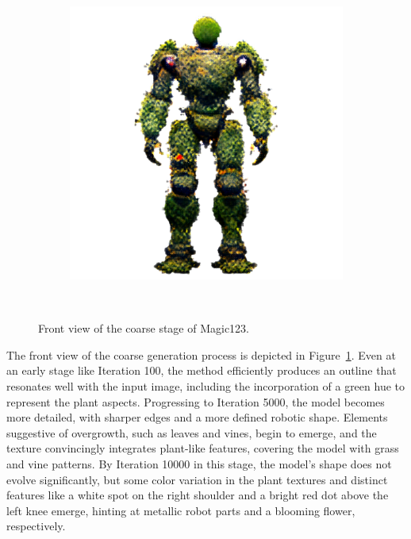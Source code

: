 \begin{figure}[H]
\begin{subfigure}[b]{0.25\textwidth}
        \includegraphics[width=\textwidth]{figures/generationProcess/magic123_coarse_robot_front_10000_part1.png}
        \caption{}
    \end{subfigure}
    \caption{Front view of the coarse stage of Magic123.}~\label{fig:generationFrontCoarseMagic123}
\end{figure}

The front view of the coarse generation process is depicted in Figure~\ref{fig:generationFrontCoarseMagic123}. Even at an early stage like Iteration 100, the method efficiently produces an outline that resonates well with the input image, including the incorporation of a green hue to represent the plant aspects. Progressing to Iteration 5000, the model becomes more detailed, with sharper edges and a more defined robotic shape. Elements suggestive of overgrowth, such as leaves and vines, begin to emerge, and the texture convincingly integrates plant-like features, covering the model with grass and vine patterns. By Iteration 10000 in this stage, the model's shape does not evolve significantly, but some color variation in the plant textures and distinct features like a white spot on the right shoulder and a bright red dot above the left knee emerge, hinting at metallic robot parts and a blooming flower, respectively.

